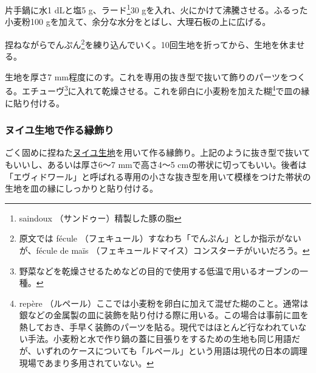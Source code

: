 \begin{recette}


片手鍋に水1 dLと塩5 g、ラード\footnote{saindoux
  （サンドゥー）精製した豚の脂}30
gを入れ、火にかけて沸騰させる。ふるった小麦粉100
gを加えて、余分な水分をとばし、大理石板の上に広げる。

捏ねながらでんぷん\footnote{原文では fécule
  （フェキュール）すなわち「でんぷん」としか指示がないが、fécule de maïs
  （フェキュールドマイス）コンスターチがいいだろう。}を練り込んでいく。10回生地を折ってから、生地を休ませる。

生地を厚さ7
mm程度にのす。これを専用の抜き型で抜いて飾りのパーツをつくる。エチューヴ\footnote{野菜などを乾燥させるためなどの目的で使用する低温で用いるオーブンの一種。}に入れて乾燥させる。これを卵白に小麦粉を加えた糊\footnote{repère
  （ルペール）ここでは小麦粉を卵白に加えて混ぜた糊のこと。通常は銀などの金属製の皿に装飾を貼り付ける際に用いる。この場合は事前に皿を熱しておき、手早く装飾のパーツを貼る。現代ではほとんど行なわれていない手法。小麦粉と水で作り鍋の蓋に目張りをするための生地も同じ用語だが、いずれのケースについても「ルペール」という用語は現代の日本の調理現場であまり多用されていない。}で皿の縁に貼り付ける。

\atoaki{}

\hypertarget{bordures-en-pate-a-nouille}{%
\subsubsection{ヌイユ生地で作る縁飾り}\label{bordures-en-pate-a-nouille}}



ごく固めに捏ねた\protect\hyperlink{nouilles}{ヌイユ生地}を用いて作る縁飾り。上記のように抜き型で抜いてもいいし、あるいは厚さ6〜7
mmで高さ4〜5
cmの帯状に切ってもいい。後者は「エヴィドワール」と呼ばれる専用の小さな抜き型を用いて模様をつけた帯状の生地を皿の縁にしっかりと貼り付ける。


\end{recette}
